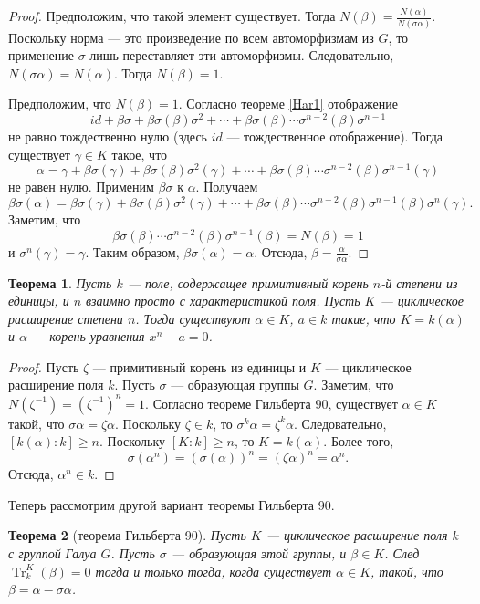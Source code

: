 \documentclass[12pt, titlepage, oneside]{amsbook}
\newcommand{\Tr}{\operatorname{Tr}}
\newtheorem{theorem}{Теорема}[chapter]
\theoremstyle{definition}
\theoremstyle{remark}
\begin{document}
\begin{proof}
Предположим, что такой элемент существует. Тогда $N(\beta)=\frac{N(\alpha)}{N(\sigma\alpha)}$. Поскольку норма --- это произведение по всем автоморфизмам из $G$, то применение $\sigma$ лишь переставляет эти автоморфизмы. Следовательно, $N(\sigma\alpha)=N(\alpha)$. Тогда $N(\beta)=1$.

Предположим, что $N(\beta)=1$. Согласно теореме \ref{Har1} отображение $$id+\beta\sigma+\beta\sigma(\beta)\sigma^2+\cdots+\beta\sigma(\beta)\cdots\sigma^{n-2}(\beta)\sigma^{n-1}$$ не равно тождественно нулю (здесь $id$ --- тождественное отображение). Тогда существует $\gamma\in K$ такое, что $$\alpha=\gamma+\beta\sigma(\gamma)+\beta\sigma(\beta)\sigma^2(\gamma)+\cdots+\beta\sigma(\beta)\cdots\sigma^{n-2}(\beta)\sigma^{n-1}(\gamma)$$ не равен нулю. Применим $\beta\sigma$ к $\alpha$. Получаем $$\beta\sigma(\alpha)=\beta\sigma(\gamma)+\beta\sigma(\beta)\sigma^2(\gamma)+\cdots+\beta\sigma(\beta)\cdots\sigma^{n-2}(\beta)\sigma^{n-1}(\beta)\sigma^{n}(\gamma).$$ Заметим, что $$\beta\sigma(\beta)\cdots\sigma^{n-2}(\beta)\sigma^{n-1}(\beta)=N(\beta)=1$$ и $\sigma^{n}(\gamma)=\gamma$. Таким образом, $\beta\sigma(\alpha)=\alpha$. Отсюда, $\beta=\frac{\alpha}{\sigma \alpha}$.
\end{proof}

\begin{theorem}
\label{Norm4}
Пусть $k$ --- поле, содержащее примитивный корень $n$-й степени из единицы, и $n$ взаимно просто с характеристикой поля. Пусть $K$ --- циклическое расширение степени $n$. Тогда существуют $\alpha\in K$, $a\in k$ такие, что $K=k(\alpha)$ и $\alpha$ --- корень уравнения $x^n-a=0$.
\end{theorem}

\begin{proof}
Пусть $\zeta$ --- примитивный корень из единицы и $K$ --- циклическое расширение поля $k$. Пусть $\sigma$ --- образующая группы $G$. Заметим, что $N(\zeta^{-1})=(\zeta^{-1})^n=1$. Согласно теореме Гильберта 90, существует $\alpha\in K$ такой, что $\sigma\alpha=\zeta\alpha$. Поскольку $\zeta\in k$, то $\sigma^k\alpha=\zeta^k\alpha$. Следовательно, $[k(\alpha):k]\geq n$. Поскольку $[K:k]\geq n$, то $K=k(\alpha)$. Более того, $$\sigma(\alpha^n)=(\sigma(\alpha))^n=(\zeta\alpha)^n=\alpha^n.$$ Отсюда, $\alpha^n\in k$.
\end{proof}

Теперь рассмотрим другой вариант теоремы Гильберта 90.

\begin{theorem}[теорема Гильберта 90]
\label{NorGil2}
Пусть $K$ --- циклическое расширение поля $k$ с группой Галуа $G$. Пусть $\sigma$ --- образующая этой группы, и $\beta\in K$. След $\Tr_k^K(\beta)=0$ тогда и только тогда, когда существует $\alpha\in K$, такой, что $\beta=\alpha-\sigma \alpha$.
\end{theorem}
\end{document}
